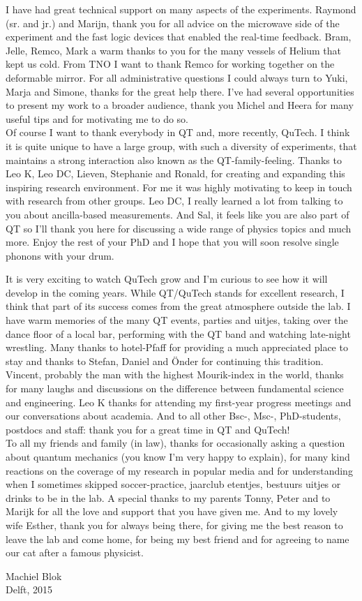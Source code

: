 I have had great technical support on many aspects of the experiments. Raymond (sr. and jr.) and Marijn, thank you for all advice on the microwave side of the experiment and the fast logic devices that enabled the real-time feedback. Bram, Jelle, Remco, Mark a warm thanks to you for the many vessels of Helium that kept us cold. From TNO I want to thank Remco for working together on the deformable mirror. For all administrative questions I could always turn to Yuki, Marja and Simone, thanks for the great help there. I've had several opportunities to present my work to a broader audience, thank you Michel and Heera for many useful tips and for motivating me to do so.\\

Of course I want to thank everybody in QT and, more recently, QuTech. I think it is quite unique to have a large group, with such a diversity of experiments, that maintains a strong interaction also known as the QT-family-feeling. Thanks to Leo K, Leo DC, Lieven, Stephanie and Ronald, for creating and expanding this inspiring research environment. For me it was highly motivating to keep in touch with research from other groups. Leo DC, I really learned a lot from talking to you about ancilla-based measurements. And Sal, it feels like you are also part of QT so I'll thank you here for discussing a wide range of physics topics and much more. Enjoy the rest of your PhD and I hope that you will soon resolve single phonons with your drum.

It is very exciting to watch QuTech grow and I'm curious to see how it will develop in the coming years. While QT/QuTech stands for excellent research, I think that part of its success comes from the great atmosphere outside the lab. I have warm memories of the many QT events, parties and uitjes, taking over the dance floor of a local bar, performing with the QT band and watching late-night wrestling. Many thanks to hotel-Pfaff for providing a much appreciated place to stay and thanks to Stefan, Daniel and \"{O}nder for continuing this tradition. Vincent, probably the man with the highest Mourik-index in the world, thanks for many laughs and discussions on the difference between fundamental science and engineering. Leo K thanks for attending my first-year progress meetings and our conversations about academia. And to all other Bsc-, Msc-, PhD-students, postdocs and staff: thank you for a great time in QT and QuTech! \\

To all my friends and family (in law), thanks for occasionally asking a question about quantum mechanics (you know I'm very happy to explain), for many kind reactions on the coverage of my research in popular media and for understanding when I sometimes skipped soccer-practice, jaarclub etentjes, bestuurs uitjes or drinks to be in the lab. A special thanks to my parents Tonny, Peter and to Marijk for all the love and support that you have given me. And to my lovely wife Esther, thank you for always being there, for giving me the best reason to leave the lab and come home, for being my best friend and for agreeing to name our cat after a famous physicist. 

\begin{flushright}
Machiel Blok\\
Delft, 2015
\end{flushright}
%